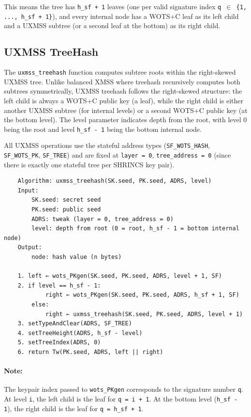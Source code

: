 This means the tree has \texttt{h\_sf + 1} leaves (one per valid signature index \texttt{q $\in$ \{1, ..., h\_sf + 1\}}), and every internal node has a WOTS+C leaf as its left child and a UXMSS subtree (or a second leaf at the bottom) as its right child.

\subsection{UXMSS TreeHash}
The \texttt{uxmss\_treehash} function computes subtree roots within the right-skewed UXMSS tree. Unlike balanced XMSS where treehash recursively computes both subtrees symmetrically, UXMSS treehash follows the right-skewed structure: the left child is always a WOTS+C public key (a leaf), while the right child is either another UXMSS subtree (for internal levels) or a second WOTS+C public key (at the bottom level). The level parameter indicates depth from the root, with level 0 being the root and level \texttt{h\_sf - 1} being the bottom internal node.

All UXMSS operations use the stateful address types (\texttt{SF\_WOTS\_HASH}, \texttt{SF\_WOTS\_PK}, \texttt{SF\_TREE}) and are fixed at \texttt{layer = 0}, \texttt{tree\_address = 0} (since there is exactly one stateful tree per SHRINCS key pair).

\begin{verbatim}
    Algorithm: uxmss_treehash(SK.seed, PK.seed, ADRS, level)
    Input:
        SK.seed: secret seed
        PK.seed: public seed
        ADRS: tweak (layer = 0, tree_address = 0)
        level: depth from root (0 = root, h_sf - 1 = bottom internal node)
    Output:
        node: hash value (n bytes)

    1. left ← wots_PKgen(SK.seed, PK.seed, ADRS, level + 1, SF)
    2. if level == h_sf - 1:
            right ← wots_PKgen(SK.seed, PK.seed, ADRS, h_sf + 1, SF)
        else:
            right ← uxmss_treehash(SK.seed, PK.seed, ADRS, level + 1)
    3. setTypeAndClear(ADRS, SF_TREE)
    4. setTreeHeight(ADRS, h_sf - level)
    5. setTreeIndex(ADRS, 0)
    6. return Tw(PK.seed, ADRS, left || right)
\end{verbatim}
\paragraph{Note:} The keypair index passed to \texttt{wots\_PKgen} corresponds to the signature number \texttt{q}. At level \texttt{i}, the left child is the leaf for \texttt{q = i + 1}. At the bottom level (\texttt{h\_sf - 1}), the right child is the leaf for \texttt{q = h\_sf + 1}.

